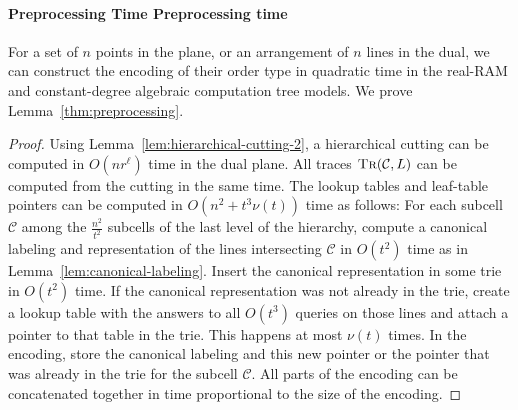 \paragraph*{\iftitlecase%
Preprocessing Time\else%
Preprocessing time\fi}
For a set of \(n\) points in the plane, or an arrangement of \(n\) lines in the
dual, we can construct the encoding of their order type in quadratic time in
the real-RAM and constant-degree algebraic computation tree models. We prove
Lemma~\ref{thm:preprocessing}.
\begin{proof}
  Using Lemma~\ref{lem:hierarchical-cutting-2},
  a hierarchical cutting can be computed in \(O(nr^\ell)\) time in the dual
  plane. All traces \(\textsc{Tr}(\mathcal{C}, L)\) can be computed from the cutting
  in the same time. The lookup tables and leaf-table pointers can be computed
  in \(O(n^2 + t^3 \nu(t))\) time as follows: For each subcell \(\mathcal{C}\)
  among the \(\frac{n^2}{t^2}\) subcells of the last level of the hierarchy,
  compute a canonical labeling and representation of the lines intersecting
  \(\mathcal{C}\) in \(O(t^2)\) time as in Lemma~\ref{lem:canonical-labeling}.
  Insert the canonical representation in some trie in \(O(t^2)\)
  time. If the canonical representation was not already in the trie, create a lookup
  table with the answers to all \(O(t^3)\) queries on those lines and attach a
  pointer to that table in the trie. This happens at most \(\nu(t)\) times.
  In the encoding, store the canonical labeling and this new pointer or the
  pointer that was already in the trie for the subcell \(\mathcal{C}\). All
  parts of the encoding can be concatenated together in time proportional to
  the size of the encoding.
\end{proof}
